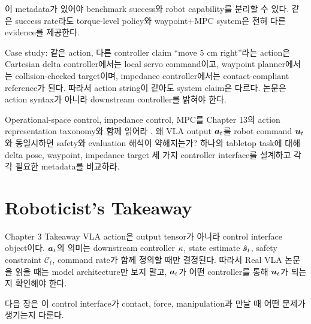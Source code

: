 이 metadata가 있어야 benchmark success와 robot capability를 분리할 수 있다. 같은 success rate라도 torque-level policy와 waypoint+MPC system은 전혀 다른 evidence를 제공한다.

\begin{casebox}{Case study: 같은 action, 다른 controller claim}
``move 5 cm right''라는 action은 Cartesian delta controller에서는 local servo command이고, waypoint planner에서는 collision-checked target이며, impedance controller에서는 contact-compliant reference가 된다. 따라서 action string이 같아도 system claim은 다르다. 논문은 action syntax가 아니라 downstream controller를 밝혀야 한다.
\end{casebox}

\chapterwork
{Operational-space control, impedance control, MPC를 Chapter 13의 action representation taxonomy와 함께 읽어라 \cite{khatib1987,hogan1985,mayne2000}.}
{왜 VLA output $\bm{a}_t$를 robot command $\bm{u}_t$와 동일시하면 safety와 evaluation 해석이 약해지는가?}
{하나의 tabletop task에 대해 delta pose, waypoint, impedance target 세 가지 controller interface를 설계하고 각각 필요한 metadata를 비교하라.}

\section{Roboticist's Takeaway}

\begin{definitionbox}{Chapter 3 Takeaway}
VLA action은 output tensor가 아니라 control interface object이다. $\bm{a}_t$의 의미는 downstream controller $\kappa$, state estimate $\hat{\bm{s}}_t$, safety constraint $\mathcal{C}_t$, command rate가 함께 정의할 때만 결정된다. 따라서 Real VLA 논문을 읽을 때는 model architecture만 보지 말고, $\bm{a}_t$가 어떤 controller를 통해 $\bm{u}_t$가 되는지 확인해야 한다.
\end{definitionbox}

다음 장은 이 control interface가 contact, force, manipulation과 만날 때 어떤 문제가 생기는지 다룬다.
